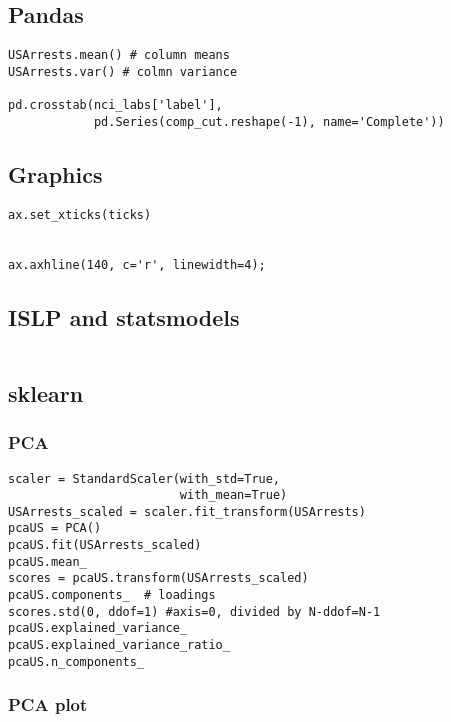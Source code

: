 \documentclass[
  letterpaper,
  DIV=11,
  numbers=noendperiod]{scrreprt}
\begin{document}
\subsection{Pandas}\label{pandas-10}

\begin{verbatim}
USArrests.mean() # column means
USArrests.var() # colmn variance

pd.crosstab(nci_labs['label'],
            pd.Series(comp_cut.reshape(-1), name='Complete'))
\end{verbatim}

\subsection{Graphics}\label{graphics-10}

\begin{verbatim}
ax.set_xticks(ticks)


ax.axhline(140, c='r', linewidth=4);
\end{verbatim}

\subsection{ISLP and statsmodels}\label{islp-and-statsmodels-8}

\begin{verbatim}
\end{verbatim}

\subsection{sklearn}\label{sklearn-8}

\subsubsection{PCA}\label{pca-1}

\begin{verbatim}
scaler = StandardScaler(with_std=True,
                        with_mean=True)
USArrests_scaled = scaler.fit_transform(USArrests)
pcaUS = PCA()
pcaUS.fit(USArrests_scaled)
pcaUS.mean_
scores = pcaUS.transform(USArrests_scaled)
pcaUS.components_  # loadings
scores.std(0, ddof=1) #axis=0, divided by N-ddof=N-1
pcaUS.explained_variance_
pcaUS.explained_variance_ratio_
pcaUS.n_components_

\end{verbatim}

\subsubsection{PCA plot}\label{pca-plot}
\end{document}
